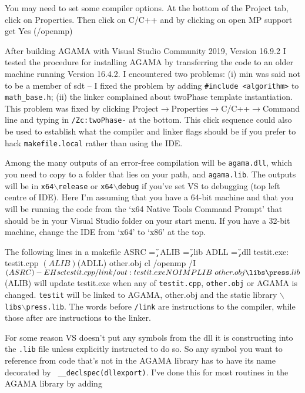 You may need to set some compiler options. At the bottom of the Project tab, click on
Properties. Then click on C/C++ and by clicking on open MP support get Yes (/openmp)

After building AGAMA with Visual Studio Community 2019, Version 16.9.2 
I tested the procedure for installing AGAMA by transferring the code to an older machine
running Version 16.4.2. I encountered two problems: (i) min was said not to be a member of
sdt -- I fixed the problem by adding {\tt \#include <algorithm>} to {\tt math\_base.h}; (ii)
the linker complained about twoPhase template instantiation. This problem was fixed by
clicking
Project$\rightarrow$Properties$\rightarrow$C/C++$\rightarrow$Command line and typing in {\tt /Zc:twoPhase-} at the bottom.
This click sequence could also be used to establish what the compiler and linker flags
should be if you prefer to hack {\tt makefile.local} rather than using the IDE.
 

Among the many outputs of an error-free compilation  will be {\tt agama.dll}, which you need to copy to a folder
that lies on your path, and {\tt agama.lib}. The outputs will be in {\tt x64$\backslash$release}
or {\tt x64$\backslash$debug} if you've set VS to debugging (top left centre of IDE). Here I'm assuming that you
have a 64-bit machine and that you will be running the code from the `x64 Native Tools
Command Prompt' that should be in your Visual Studio folder on your start menu. If you
have a 32-bit machine, change the IDE from `x64' to `x86' at the top. 

The following lines in a makefile
\begintt
ASRC = \u\c\agama\agama
ALIB  = \u\c\agama\agama{}\release\agama.lib
ADLL  = \u\c\agama\agama{}\release\agama.dll
testit.exe: testit.cpp  $(ALIB) $(ADLL) other.obj
	cl /openmp /I$(ASRC) -EHsc testit.cpp /link /out:testit.exe NOIMPLIB \ 
	other.obj \libs\press.lib $(ALIB)
\endtt
will update testit.exe when any of {\tt testit.cpp}, {\tt other.obj} or AGAMA is changed. {\tt testit} will
be linked to AGAMA, other.obj and the static library
{\tt$\backslash$libs$\backslash$press.lib}. The words before {\tt/link} are instructions
to the compiler, while those after are instructions to the linker.

For some reason VS doesn't put any symbols from the dll it is constructing into the
{\tt.lib} file unless explicitly instructed to do so. So any symbol you want to reference
from code that's not in the AGAMA library has to have its name decorated by {\tt
\_\_declspec(dllexport)}. I've done this for most routines in the AGAMA library by adding

